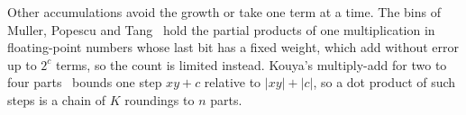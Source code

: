 \begin{remark}
Other accumulations avoid the growth or take one term at a time. The bins of Muller, Popescu and Tang~\cite{MPT16}
hold the partial products of one multiplication in floating-point numbers whose last bit has a fixed weight, which
add without error up to $2^c$ terms, so the count is limited instead. Kouya's multiply-add for two to four
parts~\cite{Kouya26fma} bounds one step $xy + c$ relative to $|xy| + |c|$, so a dot product of such steps is a chain
of $K$ roundings to $n$ parts.
\end{remark}
